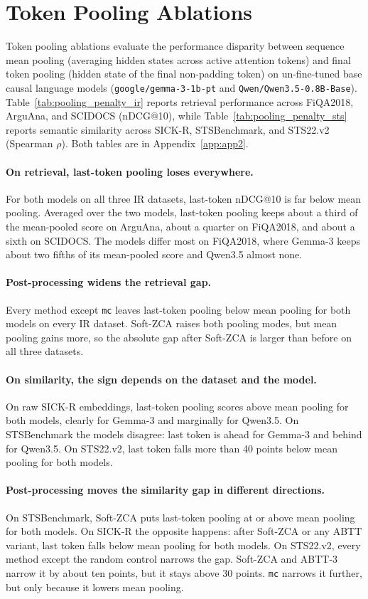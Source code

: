 \section{Token Pooling Ablations}
\label{sec:ablation_results}

Token pooling ablations evaluate the performance disparity between sequence mean pooling (averaging hidden states across active attention tokens) and final token pooling (hidden state of the final non-padding token) on un-fine-tuned base causal language models (\texttt{google/gemma-3-1b-pt} and \texttt{Qwen/Qwen3.5-0.8B-Base}). Table~\ref{tab:pooling_penalty_ir} reports retrieval performance across FiQA2018, ArguAna, and SCIDOCS (nDCG@10), while Table~\ref{tab:pooling_penalty_sts} reports semantic similarity across SICK-R, STSBenchmark, and STS22.v2 (Spearman $\rho$). Both tables are in Appendix~\ref{app:app2}.

\paragraph{On retrieval, last-token pooling loses everywhere.}
For both models on all three IR datasets, last-token nDCG@10 is far below mean pooling. Averaged over the two models, last-token pooling keeps about a third of the mean-pooled score on ArguAna, about a quarter on FiQA2018, and about a sixth on SCIDOCS. The models differ most on FiQA2018, where Gemma-3 keeps about two fifths of its mean-pooled score and Qwen3.5 almost none.

\paragraph{Post-processing widens the retrieval gap.}
Every method except \texttt{mc} leaves last-token pooling below mean pooling for both models on every IR dataset. Soft-ZCA raises both pooling modes, but mean pooling gains more, so the absolute gap after Soft-ZCA is larger than before on all three datasets.

\paragraph{On similarity, the sign depends on the dataset and the model.}
On raw SICK-R embeddings, last-token pooling scores above mean pooling for both models, clearly for Gemma-3 and marginally for Qwen3.5. On STSBenchmark the models disagree: last token is ahead for Gemma-3 and behind for Qwen3.5. On STS22.v2, last token falls more than 40 points below mean pooling for both models.

\paragraph{Post-processing moves the similarity gap in different directions.}
On STSBenchmark, Soft-ZCA puts last-token pooling at or above mean pooling for both models. On SICK-R the opposite happens: after Soft-ZCA or any ABTT variant, last token falls below mean pooling for both models. On STS22.v2, every method except the random control narrows the gap. Soft-ZCA and ABTT-3 narrow it by about ten points, but it stays above 30 points. \texttt{mc} narrows it further, but only because it lowers mean pooling.

